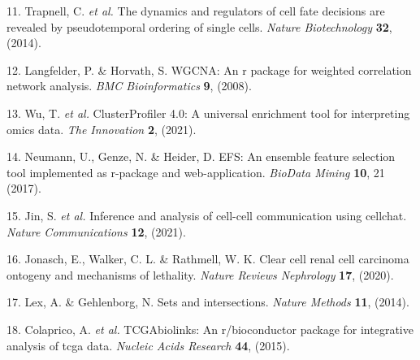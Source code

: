 \documentclass[
]{article}
\newenvironment{cslreferences}%
  {}%
  {\par}
\begin{document}
\begin{cslreferences}
\leavevmode\hypertarget{ref-TheDynamicsAnTrapne2014}{}%
11. Trapnell, C. \emph{et al.} The dynamics and regulators of cell fate decisions are revealed by pseudotemporal ordering of single cells. \emph{Nature Biotechnology} \textbf{32}, (2014).

\leavevmode\hypertarget{ref-WgcnaAnRPacLangfe2008}{}%
12. Langfelder, P. \& Horvath, S. WGCNA: An r package for weighted correlation network analysis. \emph{BMC Bioinformatics} \textbf{9}, (2008).

\leavevmode\hypertarget{ref-ClusterprofilerWuTi2021}{}%
13. Wu, T. \emph{et al.} ClusterProfiler 4.0: A universal enrichment tool for interpreting omics data. \emph{The Innovation} \textbf{2}, (2021).

\leavevmode\hypertarget{ref-EfsAnEnsemblNeuman2017}{}%
14. Neumann, U., Genze, N. \& Heider, D. EFS: An ensemble feature selection tool implemented as r-package and web-application. \emph{BioData Mining} \textbf{10}, 21 (2017).

\leavevmode\hypertarget{ref-InferenceAndAJinS2021}{}%
15. Jin, S. \emph{et al.} Inference and analysis of cell-cell communication using cellchat. \emph{Nature Communications} \textbf{12}, (2021).

\leavevmode\hypertarget{ref-ClearCellRenaJonasc2020}{}%
16. Jonasch, E., Walker, C. L. \& Rathmell, W. K. Clear cell renal cell carcinoma ontogeny and mechanisms of lethality. \emph{Nature Reviews Nephrology} \textbf{17}, (2020).

\leavevmode\hypertarget{ref-SetsAndIntersLexA2014}{}%
17. Lex, A. \& Gehlenborg, N. Sets and intersections. \emph{Nature Methods} \textbf{11}, (2014).

\leavevmode\hypertarget{ref-TcgabiolinksAColapr2015}{}%
18. Colaprico, A. \emph{et al.} TCGAbiolinks: An r/bioconductor package for integrative analysis of tcga data. \emph{Nucleic Acids Research} \textbf{44}, (2015).
\end{cslreferences}
\end{document}
